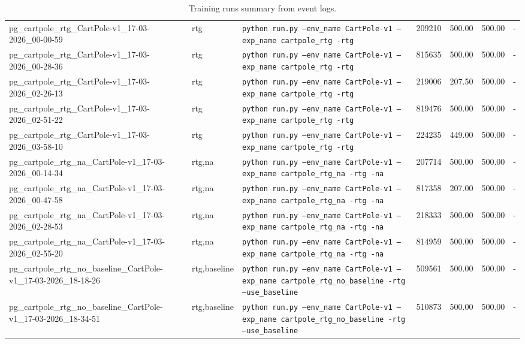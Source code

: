 \begin{table}[h]
\begin{tabular}{l l l r r r r}
pg\_cartpole\_rtg\_CartPole-v1\_17-03-2026\_00-00-59 & rtg & \texttt{python run.py --env\_name CartPole-v1 --exp\_name cartpole\_rtg -rtg} & 209210 & 500.00 & 500.00 & - \\
pg\_cartpole\_rtg\_CartPole-v1\_17-03-2026\_00-28-36 & rtg & \texttt{python run.py --env\_name CartPole-v1 --exp\_name cartpole\_rtg -rtg} & 815635 & 500.00 & 500.00 & - \\
pg\_cartpole\_rtg\_CartPole-v1\_17-03-2026\_02-26-13 & rtg & \texttt{python run.py --env\_name CartPole-v1 --exp\_name cartpole\_rtg -rtg} & 219006 & 207.50 & 500.00 & - \\
pg\_cartpole\_rtg\_CartPole-v1\_17-03-2026\_02-51-22 & rtg & \texttt{python run.py --env\_name CartPole-v1 --exp\_name cartpole\_rtg -rtg} & 819476 & 500.00 & 500.00 & - \\
pg\_cartpole\_rtg\_CartPole-v1\_17-03-2026\_03-58-10 & rtg & \texttt{python run.py --env\_name CartPole-v1 --exp\_name cartpole\_rtg -rtg} & 224235 & 449.00 & 500.00 & - \\
pg\_cartpole\_rtg\_na\_CartPole-v1\_17-03-2026\_00-14-34 & rtg,na & \texttt{python run.py --env\_name CartPole-v1 --exp\_name cartpole\_rtg\_na -rtg -na} & 207714 & 500.00 & 500.00 & - \\
pg\_cartpole\_rtg\_na\_CartPole-v1\_17-03-2026\_00-47-58 & rtg,na & \texttt{python run.py --env\_name CartPole-v1 --exp\_name cartpole\_rtg\_na -rtg -na} & 817358 & 207.00 & 500.00 & - \\
pg\_cartpole\_rtg\_na\_CartPole-v1\_17-03-2026\_02-28-53 & rtg,na & \texttt{python run.py --env\_name CartPole-v1 --exp\_name cartpole\_rtg\_na -rtg -na} & 218333 & 500.00 & 500.00 & - \\
pg\_cartpole\_rtg\_na\_CartPole-v1\_17-03-2026\_02-55-20 & rtg,na & \texttt{python run.py --env\_name CartPole-v1 --exp\_name cartpole\_rtg\_na -rtg -na} & 814959 & 500.00 & 500.00 & - \\
pg\_cartpole\_rtg\_no\_baseline\_CartPole-v1\_17-03-2026\_18-18-26 & rtg,baseline & \texttt{python run.py --env\_name CartPole-v1 --exp\_name cartpole\_rtg\_no\_baseline -rtg --use\_baseline} & 509561 & 500.00 & 500.00 & - \\
pg\_cartpole\_rtg\_no\_baseline\_CartPole-v1\_17-03-2026\_18-34-51 & rtg,baseline & \texttt{python run.py --env\_name CartPole-v1 --exp\_name cartpole\_rtg\_no\_baseline -rtg --use\_baseline} & 510873 & 500.00 & 500.00 & - \\
\hline
\end{tabular}
\caption{Training runs summary from event logs.}
\label{tab:tuning-summary}
\end{table}